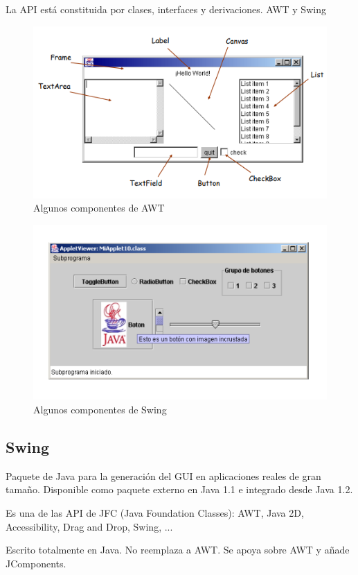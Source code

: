 \documentclass[12pt,a4paper]{report}
\begin{document}
{La API está constituida por clases, interfaces y derivaciones. 
AWT y Swing

\begin{figure}[hbtp]
\caption{Algunos componentes de AWT}
\centering
\includegraphics[scale=1]{AWT.PNG}
\end{figure}

\begin{figure}[hbtp]
\caption{Algunos componentes de Swing}
\centering
\includegraphics[scale=1]{SWING.PNG}
\end{figure}

\subsection*{Swing}
Paquete de Java para la generación del GUI en aplicaciones reales de gran tamaño. Disponible como paquete externo en Java 1.1 e integrado desde Java 1.2. 

Es una de las API de JFC (Java Foundation Classes): AWT, Java 2D, Accessibility, Drag and Drop, Swing, ... 

Escrito totalmente en Java. No reemplaza a AWT. Se apoya sobre AWT y añade JComponents.

}
\end{document}
